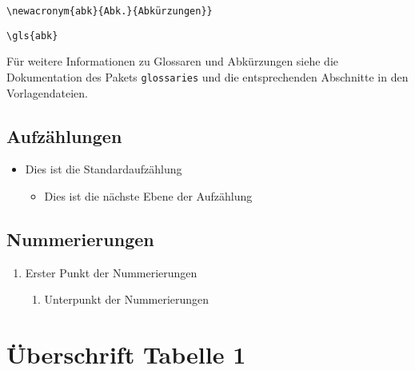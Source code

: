 \vspace{-\baselineskip}
\begin{description}[leftmargin=1em+5mm, labelindent=5mm]
\item[Definition in \texttt{Abkuerzungen.tex}:] \texttt{\textbackslash{}newacronym\{abk\}\{Abk.\}\{Abkürzungen\}\}}
\item[Referenzierung:] \texttt{\textbackslash{}gls\{abk\}}
\end{description}

Für weitere Informationen zu Glossaren und Abkürzungen siehe die Dokumentation
des Pakets \texttt{glossaries} und die entsprechenden Abschnitte in den
Vorlagendateien.


\subsection[]{Aufzählungen}

\begin{itemize}
\item Dies ist die Standardaufzählung
    \begin{itemize}
    \item Dies ist die nächste Ebene der Aufzählung
    \end{itemize}
\end{itemize}


\subsection[]{Nummerierungen}

\begin{enumerate}
\item Erster Punkt der Nummerierungen
    \begin{enumerate}
    \item Unterpunkt der Nummerierungen
    \end{enumerate}
\end{enumerate}
\clearpage

\listoffigures %

\printacronyms[title={Abkürzungsverzeichnis}] %

\listoftables %

\onehalfspacing


\vspace{22mm}
\section*{Überschrift Tabelle 1}

